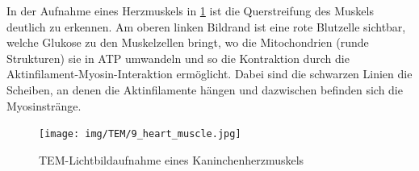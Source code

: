 In der Aufnahme eines Herzmuskels in \cref{fig:tem:muskel} ist die Querstreifung des Muskels deutlich zu erkennen.
Am oberen linken Bildrand ist eine rote Blutzelle sichtbar, welche Glukose zu den Muskelzellen bringt, wo die Mitochondrien (runde Strukturen) sie in ATP umwandeln und so die Kontraktion durch die Aktinfilament-Myosin-Interaktion ermöglicht.
Dabei sind die schwarzen Linien die Scheiben, an denen die Aktinfilamente hängen und dazwischen befinden sich die Myosinstränge.

\begin{figure}[H]
    \centering
    \texttt{[image: img/TEM/9\_heart\_muscle.jpg]}
    \caption{TEM-Lichtbildaufnahme eines Kaninchenherzmuskels}
    \label{fig:tem:muskel}
\end{figure}
